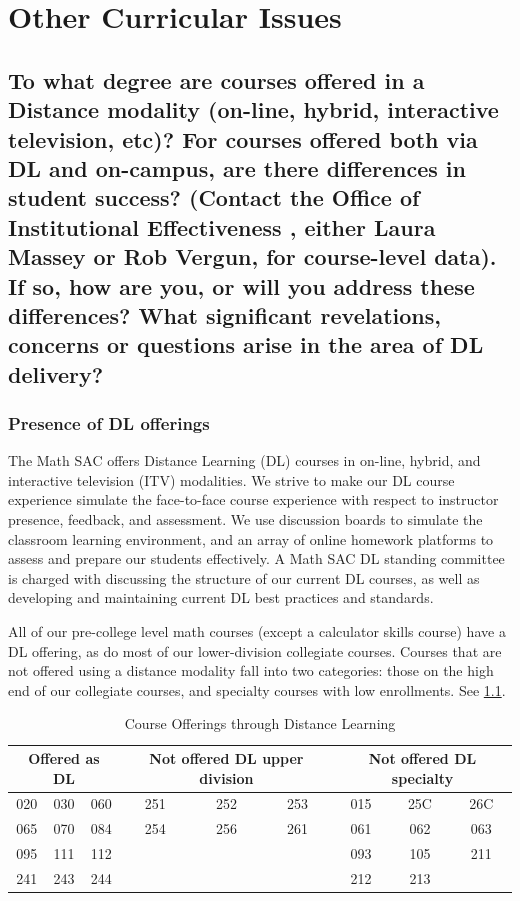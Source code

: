 \chapter{Other  Curricular Issues}
\section[Distance education]{To what degree are courses offered in a Distance modality (on-line, hybrid, interactive television, etc)? For courses offered both via DL and on-campus, are there differences in student success? (Contact the Office of Institutional Effectiveness , either Laura Massey or Rob Vergun,  for course-level data). If so, how are you, or will you address these differences? What significant revelations, concerns or questions arise in the area of DL delivery?}

\subsection{Presence of DL offerings}
The Math SAC offers Distance Learning (DL) courses in on-line, hybrid, and interactive television (ITV) modalities.  We strive to make our DL course experience simulate the face-to-face course experience with respect to instructor presence, feedback, and assessment. We use discussion boards to simulate the classroom learning environment, and an array of online homework platforms to assess and prepare our students effectively. A Math SAC DL standing committee is charged with discussing the structure of our current DL courses, as well as developing and maintaining current DL best practices and standards.

All of our pre-college level math courses (except a calculator skills course) have a DL offering, as do most of our lower-division collegiate courses.  Courses that are not offered using a distance modality fall into two categories: those on the high end of our collegiate courses, and specialty courses with low enrollments. See \cref{tab:sec3:DLofferings}.

\begin{table}
\caption{Course Offerings through Distance Learning}\label{tab:sec3:DLofferings}
\centering
\begin{tabular}{ccccccccc}
\toprule
\multicolumn{3}{p{1in}}{Offered as DL} & \multicolumn{3}{p{1in}}{Not offered  DL upper division} & \multicolumn{3}{p{1in}}{Not offered  DL specialty}\\
\midrule
020& 030& 060& 		251& 252& 253&		015& 25C& 26C\\
065& 070& 084& 		254& 256& 261&		061& 062& 063\\
095& 111& 112& 		&&&					093& 105& 211\\
241& 243& 244&		&&&					212& 213\\

\bottomrule
\end{tabular}
\end{table}

